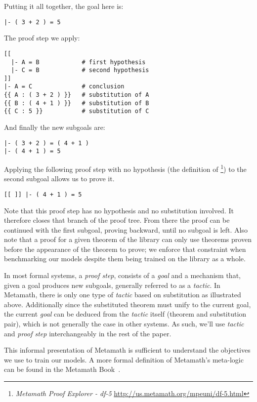 \documentclass{article}
\begin{document}
Putting it all together, the goal here is:

\begin{verbatim}
|- ( 3 + 2 ) = 5
\end{verbatim}

The proof step we apply:

\begin{verbatim}
[[
  |- A = B            # first hypothesis
  |- C = B            # second hypothesis
]]
|- A = C              # conclusion
{{ A : ( 3 + 2 ) }}   # substitution of A
{{ B : ( 4 + 1 ) }}   # substitution of B
{{ C : 5 }}           # substitution of C
\end{verbatim}

And finally the new subgoals are:

\begin{verbatim}
|- ( 3 + 2 ) = ( 4 + 1 )
|- ( 4 + 1 ) = 5
\end{verbatim}

Applying the following proof step with no hypothesis (the definition of \footnote{\textit{Metamath Proof Explorer - df-5} \url{http://us.metamath.org/mpeuni/df-5.html}}) to the second subgoal allows us to prove it.

\begin{verbatim}
[[ ]] |- ( 4 + 1 ) = 5
\end{verbatim}

Note that this proof step has no hypothesis and no substitution involved. It therefore closes that branch of the proof tree. From there the proof can be continued with the first subgoal, proving backward, until no subgoal is left. Also note that a proof for a given theorem of the library can only use theorems proven before the appearance of the theorem to prove; we enforce that constraint when benchmarking our models despite them being trained on the library as a whole.

In most formal systems, a \textit{proof step}, consists of a \textit{goal} and a mechanism that, given a goal produces new subgoals, generally referred to as a \textit{tactic}. In Metamath, there is only one type of \textit{tactic} based on substitution as illustrated above. Additionally since the substituted theorem must unify to the current goal, the current \textit{goal} can be deduced from the \textit{tactic} itself (theorem and substitution pair), which is not generally the case in other systems. As such, we'll use \textit{tactic} and \textit{proof step} interchangeably in the rest of the paper.

This informal presentation of Metamath is sufficient to understand the objectives we use to train our models. A more formal definition of Metamath's meta-logic can be found in the Metamath Book~\cite{megill2019metamath}.
\end{document}
